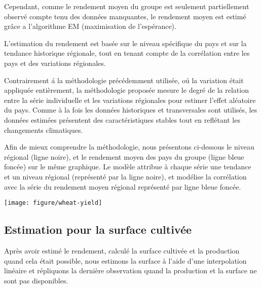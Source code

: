 \documentclass[nojss]{jss}\usepackage{graphicx, color}
\makeatletter
\def\maxwidth{ %
  \ifdim\Gin@nat@width>\linewidth
    \linewidth
  \else
    \Gin@nat@width
  \fi
}
\newenvironment{knitrout}{}{} %
\makeatother
\begin{document}
Cependant, comme le rendement moyen du groupe est seulement
partiellement observ\'{e} compte tenu des donn\'{e}es manquantes, le
rendement moyen est estim\'{e} gr\^{a}ce a l'algorithme EM (maximisation
de l'esp\'{e}rance).

L'estimation du rendement est bas\'{e}e sur le niveau sp\'{e}cifique
du pays et sur la tendance historique r\'{e}gionale, tout en tenant
compte de la corr\'{e}lation entre les pays et des variations
r\'{e}gionales.

Contrairement \'{a} la m\'{e}thodologie pr\'{e}c\'{e}demment
utilis\'{e}e, o\'{u} la variation \'{e}tait appliqu\'{e}e
enti\`{e}rement, la m\'{e}thodologie propos\'{e}e mesure le degr\'{e}
de la relation entre la s\'{e}rie individuelle et les variations
r\'{e}gionales pour estimer l'effet al\'{e}atoire du pays. Comme \`{a}
la fois les donn\'{e}es historiques et transversales sont
utilis\'{e}s, les donn\'{e}es estim\'{e}es pr\'{e}sentent des
caract\'{e}ristiques stables tout en refl\'{e}tant les changements
climatiques.


Afin de mieux comprendre la m\'{e}thodologie, nous pr\'{e}sentons
ci-dessous le niveau r\'{e}gional (ligne noire), et le rendement moyen
des pays du groupe (ligne bleue fonc\'{e}e) sur le m\^{e}me
graphique. Le mod\`{e}le attribue \`{a} chaque s\'{e}rie une tendance
et un niveau r\'{e}gional (repr\'{e}sent\'{e} par la ligne noire), et
mod\'{e}lise la corr\'{e}lation avec la s\'{e}rie du rendement moyen
r\'{e}gional repr\'{e}sent\'{e} par ligne bleue fonc\'{e}e.


\begin{knitrout}
\color{fgcolor}

{\centering \texttt{[image: figure/wheat-yield]} 

}



\end{knitrout}




\subsection{Estimation pour la surface cultiv\'{e}e }

Apr\`{e}s avoir estim\'{e} le rendement, calcul\'{e} la surface
cultiv\'{e}e et la production quand cela \'{e}tait possible, nous
estimons la surface \`{a} l'aide d'une interpolation lin\'{e}aire et
r\'{e}pliquons la derni\`{e}re observation quand la production et la
surface ne sont pas disponibles.
\end{document}
